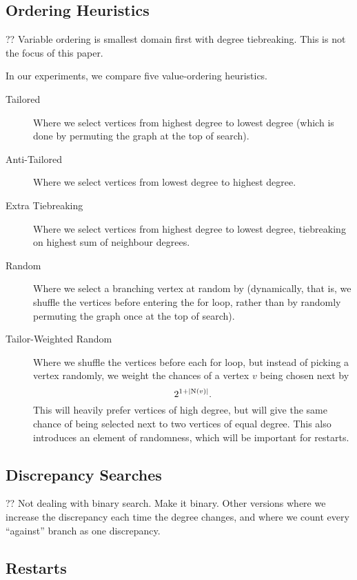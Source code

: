 \documentclass{article}
\begin{document}
\subsection{Ordering Heuristics}

?? Variable ordering is smallest domain first with degree tiebreaking. This is not the focus of this
paper.

In our experiments, we compare five value-ordering heuristics.

\begin{description}
    \item[Tailored] Where we select vertices from highest degree to lowest degree (which is done by
        permuting the graph at the top of search).
    \item[Anti-Tailored] Where we select vertices from lowest degree to highest degree.
    \item[Extra Tiebreaking] Where we select vertices from highest degree to lowest degree,
        tiebreaking on highest sum of neighbour degrees.
    \item[Random] Where we select a branching vertex at random by (dynamically, that is, we shuffle
        the vertices before entering the for loop, rather than by randomly permuting the graph once at the
        top of search).
    \item[Tailor-Weighted Random] Where we shuffle the vertices before each for loop, but instead of
        picking a vertex randomly, we weight the chances of a vertex $v$ being chosen next by \[
            2^{1 + \left|\operatorname{N}(v)\right|} \textnormal{.} \]
        This will heavily prefer vertices of high degree, but will give the same chance of being
        selected next to two vertices of equal degree. This also introduces an element of
        randomness, which will be important for restarts.
\end{description}

\subsection{Discrepancy Searches}

?? Not dealing with binary search. Make it binary. Other versions where we increase the discrepancy
each time the degree changes, and where we count every ``against'' branch as one discrepancy.

\subsection{Restarts}
\end{document}
